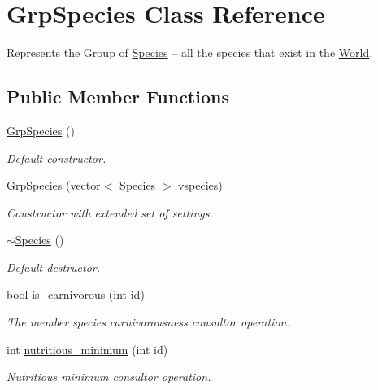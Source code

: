 \hypertarget{class_grp_species}{\section{Grp\-Species Class Reference}
\label{class_grp_species}
}


Represents the Group of \hyperlink{class_species}{Species} – all the species that exist in the \hyperlink{class_world}{World}.  


\subsection*{Public Member Functions}
\begin{DoxyCompactItemize}
\item 
\hyperlink{class_grp_species_aae01eb441932fe90e69af5295f7449d3}{Grp\-Species} ()
\begin{DoxyCompactList}\small\item\em Default constructor. \end{DoxyCompactList}\item 
\hyperlink{class_grp_species_a1ab7e26f4300775b44cc74044e45335c}{Grp\-Species} (vector$<$ \hyperlink{class_species}{Species} $>$ vspecies)
\begin{DoxyCompactList}\small\item\em Constructor with extended set of settings. \end{DoxyCompactList}\item 
\hyperlink{class_grp_species_aefa7f81cd9c5040080661a0aebbe94dd}{$\sim$\-Species} ()
\begin{DoxyCompactList}\small\item\em Default destructor. \end{DoxyCompactList}\item 
bool \hyperlink{class_grp_species_a40bca706f2c7ff5c29ad64efef91f5b0}{is\-\_\-carnivorous} (int id)
\begin{DoxyCompactList}\small\item\em The member species carnivorousness consultor operation. \end{DoxyCompactList}\item 
int \hyperlink{class_grp_species_ad805d0ed7ae160591693a234cf13383e}{nutritious\-\_\-minimum} (int id)
\begin{DoxyCompactList}\small\item\em Nutritious minimum consultor operation. \end{DoxyCompactList}\item 

\end{DoxyCompactItemize}
